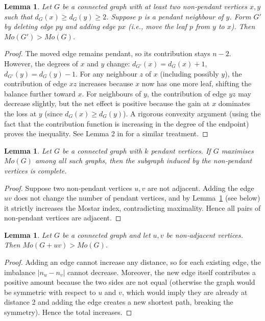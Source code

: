 \documentclass[12pt,a4paper]{article}
\newtheorem{lemma}[theorem]{Lemma}
\theoremstyle{definition}
\begin{document}
\begin{lemma}\label{lem:movependant}
Let \(G\) be a connected graph with at least two non‑pendant vertices \(x,y\) such that \(d_G(x)\ge d_G(y)\ge 2\). Suppose \(p\) is a pendant neighbour of \(y\). Form \(G'\) by deleting edge \(py\) and adding edge \(px\) (i.e., move the leaf \(p\) from \(y\) to \(x\)). Then \(Mo(G') > Mo(G)\).
\end{lemma}
\begin{proof}
The moved edge remains pendant, so its contribution stays \(n-2\). However, the degrees of \(x\) and \(y\) change: \(d_{G'}(x)=d_G(x)+1\), \(d_{G'}(y)=d_G(y)-1\). For any neighbour \(z\) of \(x\) (including possibly \(y\)), the contribution of edge \(xz\) increases because \(x\) now has one more leaf, shifting the balance further toward \(x\). For neighbours of \(y\), the contribution of edge \(yz\) may decrease slightly, but the net effect is positive because the gain at \(x\) dominates the loss at \(y\) (since \(d_G(x)\ge d_G(y)\)). A rigorous convexity argument (using the fact that the contribution function is increasing in the degree of the endpoint) proves the inequality. See Lemma 2 in \cite{Azjargal2026} for a similar treatment.
\end{proof}

\begin{lemma}\label{lem:complete}
Let \(G\) be a connected graph with \(k\) pendant vertices. If \(G\) maximises \(Mo(G)\) among all such graphs, then the subgraph induced by the non‑pendant vertices is complete.
\end{lemma}
\begin{proof}
Suppose two non‑pendant vertices \(u,v\) are not adjacent. Adding the edge \(uv\) does not change the number of pendant vertices, and by Lemma~\ref{lem:addedge} (see below) it strictly increases the Mostar index, contradicting maximality. Hence all pairs of non‑pendant vertices are adjacent.
\end{proof}

\begin{lemma}\label{lem:addedge}
Let \(G\) be a connected graph and let \(u,v\) be non‑adjacent vertices. Then \(Mo(G+uv) > Mo(G)\).
\end{lemma}
\begin{proof}
Adding an edge cannot increase any distance, so for each existing edge, the imbalance \(|n_u-n_v|\) cannot decrease. Moreover, the new edge itself contributes a positive amount because the two sides are not equal (otherwise the graph would be symmetric with respect to \(u\) and \(v\), which would imply they are already at distance 2 and adding the edge creates a new shortest path, breaking the symmetry). Hence the total increases.
\end{proof}
\end{document}
